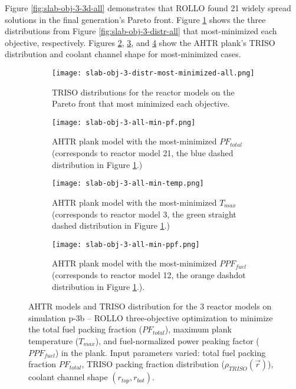 Figure \ref{fig:slab-obj-3-3d-all} demonstrates that \gls{ROLLO} found 21 widely spread 
solutions in the final generation's Pareto front. 
Figure \ref{fig:slab-obj-3-distr-most-minimized-distr-all} shows the three distributions 
from Figure \ref{fig:slab-obj-3-distr-all} that most-minimized each objective, 
respectively.
Figures \ref{fig:slab-obj-3-all-min-pf}, \ref{fig:slab-obj-3-all-min-temp}, and 
\ref{fig:slab-obj-3-all-min-ppf} show the \gls{AHTR} plank's TRISO distribution and 
coolant channel shape for most-minimized cases. 
\begin{figure}[htbp!]
    \begin{subfigure}{\textwidth}
        \texttt{[image: slab-obj-3-distr-most-minimized-all.png]}
        \caption{TRISO distributions for the reactor models on the Pareto 
        front that most minimized each objective.}
        \label{fig:slab-obj-3-distr-most-minimized-distr-all}
    \end{subfigure}
    \begin{subfigure}{\textwidth}
        \texttt{[image: slab-obj-3-all-min-pf.png]}
        \caption{\gls{AHTR} plank model with the most-minimized $PF_{total}$ 
        (corresponds to reactor model 21, the blue dashed distribution in 
        Figure \ref{fig:slab-obj-3-distr-most-minimized-distr-all}.)}
        \label{fig:slab-obj-3-all-min-pf}
    \end{subfigure}
    \begin{subfigure}{\textwidth}
        \texttt{[image: slab-obj-3-all-min-temp.png]}
        \caption{\gls{AHTR} plank model with the most-minimized $T_{max}$
        (corresponds to reactor model 3, the green straight dashed distribution 
        in Figure \ref{fig:slab-obj-3-distr-most-minimized-distr-all}.)}
        \label{fig:slab-obj-3-all-min-temp}
    \end{subfigure}
    \begin{subfigure}{\textwidth}
        \texttt{[image: slab-obj-3-all-min-ppf.png]}
        \caption{\gls{AHTR} plank model with the most-minimized $PPF_{fuel}$
        (corresponds to reactor model 12, the orange dashdot distribution 
        in Figure \ref{fig:slab-obj-3-distr-most-minimized-distr-all}.).}
        \label{fig:slab-obj-3-all-min-ppf}
    \end{subfigure}
    \caption{AHTR models and TRISO distribution for the 3 reactor models on simulation 
    p-3b -- ROLLO three-objective optimization to minimize the total 
    fuel packing fraction ($PF_{total}$), maximum plank temperature ($T_{max}$), and 
    fuel-normalized power peaking factor ($PPF_{fuel}$) in the plank. 
    Input parameters varied: total fuel packing fraction $PF_{total}$, 
    TRISO packing fraction distribution ($\rho_{TRISO}(\vec{r})$), 
    coolant channel shape $(r_{top}, r_{bot})$.}
    \label{fig:slab-obj-3-distr-most-minimized-all}
\end{figure}

